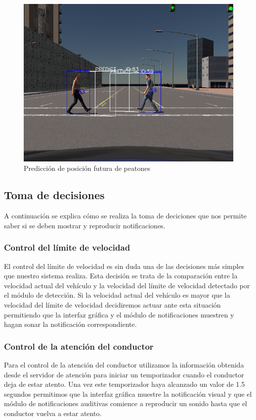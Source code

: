\begin{figure}[h!]
    \centering
    \includegraphics[width=0.9\linewidth]{img/peatones.png}
    \caption{Predicción de posición futura de peatones}
    \label{fig:peatones}    
\end{figure}


\clearpage
\subsection{Toma de decisiones}

A continuación se explica cómo se realiza la toma de deciciones que nos permite saber si se deben mostrar y reproducir notificaciones.

\subsubsection{Control del límite de velocidad}
El control del límite de velocidad es sin duda una de las decisiones más simples que nuestro sistema realiza. 
Esta decisión se trata de la comparación entre la velocidad actual del vehículo y la velocidad del límite de velocidad detectado por el módulo de detección.
Si la velocidad actual del vehículo es mayor que la velocidad del límite de velocidad decidiremos actuar ante esta situación permitiendo que la interfaz gráfica y el módulo de notificaciones muestren y hagan sonar la notificación correspondiente.

\subsubsection{Control de la atención del conductor}
Para el control de la atención del conductor utilizamos la información obtenida desde el servidor de atención para iniciar un temporizador cuando el conductor deja de estar atento.
Una vez este temporizador haya alcanzado un valor de 1.5 segundos permitimos que la interfaz gráfica muestre la notificación visual y que el módulo de notificaciones auditivas comience a reproducir un sonido hasta que el conductor vuelva a estar atento.

